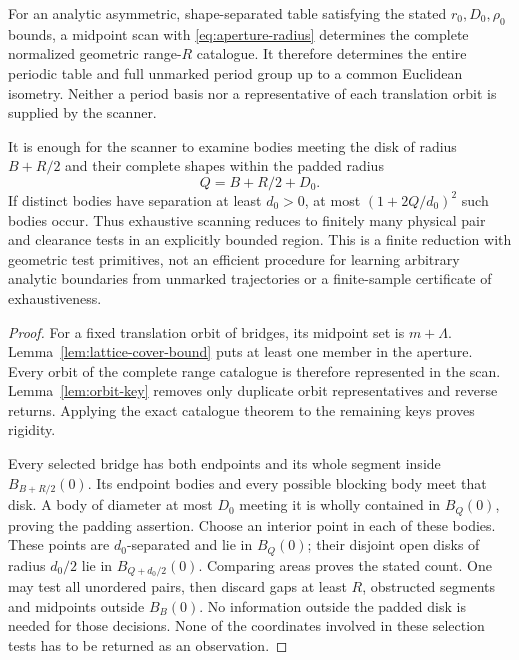 \begin{theorem}
\label{thm:finite-aperture}
For an analytic asymmetric, shape-separated table satisfying the stated
$r_0,D_0,\rho_0$ bounds, a midpoint scan with \eqref{eq:aperture-radius}
determines the complete normalized geometric range-$R$ catalogue. It
therefore determines the entire periodic table and full unmarked period
group up to a common Euclidean isometry. Neither a period basis nor a
representative of each translation orbit is supplied by the scanner.

It is enough for the scanner to examine bodies meeting the disk of radius
$B+R/2$ and their complete shapes within the padded radius
\begin{equation}\label{eq:padded-aperture}
                         Q=B+R/2+D_0.
\end{equation}
If distinct bodies have separation at least $d_0>0$, at most
$(1+2Q/d_0)^2$ such bodies occur. Thus exhaustive scanning reduces to
finitely many physical pair and clearance tests in an explicitly bounded
region. This is a finite reduction with geometric test primitives, not
an efficient procedure for learning arbitrary analytic boundaries from
unmarked trajectories or a finite-sample certificate of exhaustiveness.
\end{theorem}
\begin{proof}
For a fixed translation orbit of bridges, its midpoint set is
$m+\Lambda$. Lemma~\ref{lem:lattice-cover-bound} puts at least one
member in the aperture. Every orbit of the complete range catalogue is
therefore represented in the scan. Lemma~\ref{lem:orbit-key} removes only
duplicate orbit representatives and reverse returns. Applying the exact
catalogue theorem to the remaining keys proves rigidity.

Every selected bridge has both endpoints and its whole segment inside
$B_{B+R/2}(0)$. Its endpoint bodies and every possible blocking body
meet that disk. A body of diameter at most $D_0$ meeting it is wholly
contained in $B_Q(0)$, proving the padding assertion. Choose an interior
point in each of these bodies. These points are $d_0$-separated and
lie in $B_Q(0)$; their disjoint open disks of radius $d_0/2$ lie in
$B_{Q+d_0/2}(0)$. Comparing areas proves the stated count. One may test
all unordered pairs, then discard gaps at least $R$, obstructed segments
and midpoints outside $B_B(0)$. No information outside the padded disk
is needed for those decisions. None of the coordinates involved in these
selection tests has to be returned as an observation.
\end{proof}

